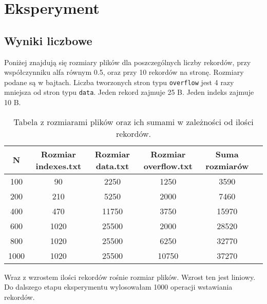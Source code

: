 \documentclass{article}
\begin{document}
    \section*{Eksperyment}


    \subsection*{Wyniki liczbowe}

    Poniżej znajdują się rozmiary plików dla poszczególnych liczby rekordów, przy współczynniku alfa równym 0.5, oraz przy 10 rekordów na stronę. Rozmiary podane są w bajtach.
    Liczba tworzonych stron typu \texttt{overflow} jest 4 razy mniejsza od stron typu \texttt{data}.
    Jeden rekord zajmuje 25 B. Jeden indeks zajmuje 10 B.

    \begin{table}[H]
        \centering
        \begin{tabular}{cccccc}
        \toprule
        \textbf{N} & \textbf{Rozmiar indexes.txt} & \textbf{Rozmiar data.txt} & \textbf{Rozmiar overflow.txt} & \textbf{Suma rozmiarów} \\
        \midrule
        100  & 90   & 2250  & 1250  & 3590  \\
        200  & 210  & 5250  & 2000  & 7460  \\
        400  & 470  & 11750 & 3750  & 15970 \\
        600  & 1020 & 25500 & 2000  & 28520 \\
        800  & 1020 & 25500 & 6250  & 32770 \\
        1000 & 1020 & 25500 & 10750 & 37270 \\
        \bottomrule
        \end{tabular}
        \caption{Tabela z rozmiarami plików oraz ich sumami w zależności od ilości rekordów.}
        \label{tab:sizes}
    \end{table}

    \noindent Wraz z wzrostem ilości rekordów rośnie rozmiar plików. Wzrost ten jest liniowy. \\

    \noindent Do dalszego etapu eksperymentu wylosowałam 1000 operacji wstawiania rekordów.
\end{document}
